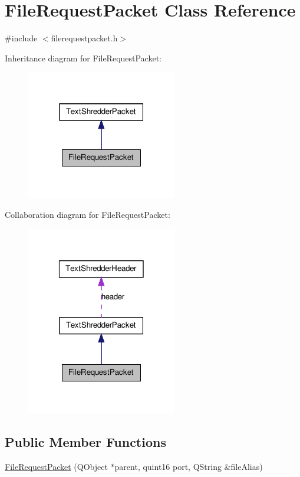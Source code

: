 \hypertarget{class_file_request_packet}{
\section{FileRequestPacket Class Reference}
\label{class_file_request_packet}
}


{\ttfamily \#include $<$filerequestpacket.h$>$}



Inheritance diagram for FileRequestPacket:\nopagebreak
\begin{figure}[H]
\begin{center}
\leavevmode
\includegraphics[width=186pt]{class_file_request_packet__inherit__graph}
\end{center}
\end{figure}


Collaboration diagram for FileRequestPacket:\nopagebreak
\begin{figure}[H]
\begin{center}
\leavevmode
\includegraphics[width=186pt]{class_file_request_packet__coll__graph}
\end{center}
\end{figure}
\subsection*{Public Member Functions}
\begin{DoxyCompactItemize}
\item 
\hyperlink{class_file_request_packet_a53340391be5b6d4d8f849e84b25014e8}{FileRequestPacket} (QObject $\ast$parent, quint16 port, QString \&fileAlias)
\end{DoxyCompactItemize}
